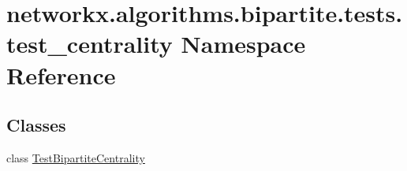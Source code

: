 \hypertarget{namespacenetworkx_1_1algorithms_1_1bipartite_1_1tests_1_1test__centrality}{}\section{networkx.\+algorithms.\+bipartite.\+tests.\+test\+\_\+centrality Namespace Reference}
\label{namespacenetworkx_1_1algorithms_1_1bipartite_1_1tests_1_1test__centrality}
\subsection*{Classes}
\begin{DoxyCompactItemize}
\item 
class \hyperlink{classnetworkx_1_1algorithms_1_1bipartite_1_1tests_1_1test__centrality_1_1TestBipartiteCentrality}{Test\+Bipartite\+Centrality}
\end{DoxyCompactItemize}
